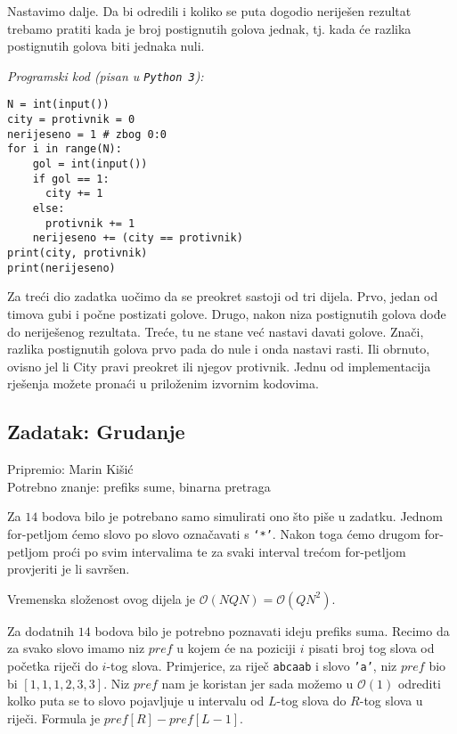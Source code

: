 \documentclass[a4paper]{article}
\begin{document}
Nastavimo dalje. Da bi odredili i koliko se puta dogodio neriješen rezultat
trebamo pratiti kada je broj postignutih golova jednak, tj. kada će razlika
postignutih golova biti jednaka nuli.

\textit{Programski kod (pisan u \texttt{Python 3}):}

\vspace{-2ex}
\begin{verbatim}
N = int(input())
city = protivnik = 0
nerijeseno = 1 # zbog 0:0
for i in range(N):
    gol = int(input())
    if gol == 1:
      city += 1
    else:
      protivnik += 1
    nerijeseno += (city == protivnik)
print(city, protivnik)
print(nerijeseno)
\end{verbatim}

Za treći dio zadatka uočimo da se preokret sastoji od tri dijela. Prvo, jedan
od timova gubi i počne postizati golove. Drugo, nakon niza postignutih golova
dođe do neriješenog rezultata. Treće, tu ne stane već nastavi davati golove.
Znači, razlika postignutih golova prvo pada do nule i onda nastavi rasti. Ili
obrnuto, ovisno jel li City pravi preokret ili njegov protivnik. Jednu od
implementacija rješenja možete pronaći u priloženim izvornim kodovima.

\clearpage

\subsection*{Zadatak: Grudanje}
\textsf{Pripremio: Marin Kišić}\\
\textsf{Potrebno znanje: prefiks sume, binarna pretraga}

Za $14$ bodova bilo je potrebano samo simulirati ono što piše u zadatku. Jednom
for-petljom ćemo slovo po slovo označavati s \texttt{‘*’}. Nakon toga ćemo
drugom for-petljom proći po svim intervalima te za svaki interval trećom
for-petljom provjeriti je li savršen.

Vremenska složenost ovog dijela je $\mathcal{O}(NQN)=\mathcal{O}(QN^2)$.

Za dodatnih $14$ bodova bilo je potrebno poznavati ideju prefiks suma. Recimo
da za svako slovo imamo niz $pref$ u kojem će na poziciji $i$ pisati broj tog
slova od početka riječi do $i$-tog slova. Primjerice, za riječ \texttt{abcaab}
i slovo \texttt{'a'}, niz $pref$ bio bi $[1, 1, 1, 2, 3, 3]$. Niz $pref$ nam je
koristan jer sada možemo u $\mathcal{O}(1)$ odrediti kolko puta se to slovo
pojavljuje u intervalu od
$L$-tog slova do $R$-tog slova u riječi. Formula je $pref[R]-pref[L-1]$.
\end{document}
